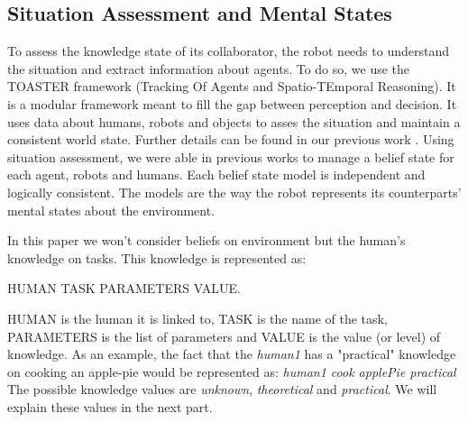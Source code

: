 \documentclass{llncs}
\begin{document}
\subsection{Situation Assessment and Mental States}
To assess the knowledge state of its collaborator, the robot needs to understand the situation and extract information about agents.
To do so, we use the TOASTER framework (Tracking Of Agents and Spatio-TEmporal Reasoning). It is a modular framework meant to fill the gap between perception and decision. It uses data about humans, robots and objects to asses the situation and maintain a consistent world state. 
Further details can be found in our previous work \cite{Milliez2014}.
%
Using situation assessment, we were able in previous works to manage a belief state for each agent, robots and humans. Each belief state model is independent and logically consistent. The models are the way the robot represents its counterparts' mental states about the environment.

%
In this paper we won't consider beliefs on environment but the human's knowledge on tasks. This knowledge is represented as: 

HUMAN TASK PARAMETERS VALUE. 

HUMAN is the human it is linked to, TASK is the name of the task, PARAMETERS is the list of parameters and VALUE is the value (or level) of knowledge.
%
As an example, the fact that the \textit{human1} has a "practical" knowledge on cooking an apple-pie would be represented as: \textit{human1 cook applePie practical}
The possible knowledge values are \textit{unknown}, \textit{theoretical} and \textit{practical}. We will explain these values in the next part.
\end{document}
